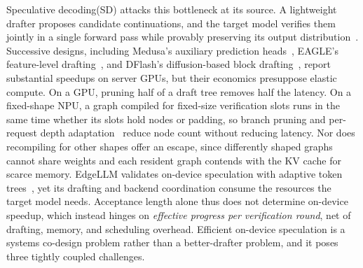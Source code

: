 \documentclass[sigconf,nonacm,10pt]{acmart}
\begin{document}
Speculative decoding(SD) attacks this bottleneck at its source. A lightweight drafter proposes candidate continuations, and the target model verifies them jointly in a single forward pass while provably preserving its output distribution~\cite{leviathan2023fast,miao2024specinfer}. Successive designs, including Medusa's auxiliary prediction heads~\cite{cai2024medusa}, EAGLE's feature-level drafting~\cite{li2024eagle,li2024eagle2,li2025eagle3}, and DFlash's diffusion-based block drafting~\cite{chen2026dflash}, report substantial speedups on server GPUs, but their economics presuppose elastic compute. On a GPU, pruning half of a draft tree removes half the latency. On a fixed-shape NPU, a graph compiled for fixed-size verification slots runs in the same time whether its slots hold nodes or padding, so branch pruning and per-request depth adaptation~\cite{zhang2025svip} reduce node count without reducing latency. Nor does recompiling for other shapes offer an escape, since differently shaped graphs cannot share weights and each resident graph contends with the KV cache for scarce memory. EdgeLLM validates on-device speculation with adaptive token trees~\cite{xu2025edgellm}, yet its drafting and backend coordination consume the resources the target model needs. Acceptance length alone thus does not determine on-device speedup, which instead hinges on \emph{effective progress per verification round}, net of drafting, memory, and scheduling overhead. Efficient on-device speculation is a systems co-design problem rather than a better-drafter problem, and it poses three tightly coupled challenges.
\end{document}
